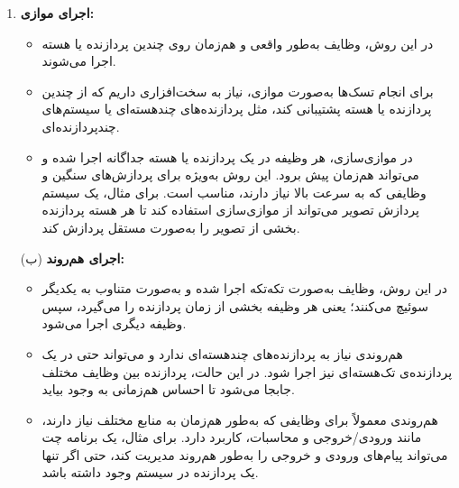 \begin{enumerate}
	\begin{qsolve}
		\begin{enumerate}
			\item 
			\textbf{اجرای موازی:}\\
			\begin{itemize}
				\item 
				در این روش، وظایف به‌طور واقعی و هم‌زمان روی چندین پردازنده یا هسته اجرا می‌شوند.
				
				\item 
				برای انجام تسک‌ها به‌صورت موازی، نیاز به سخت‌افزاری داریم که از چندین پردازنده یا هسته پشتیبانی کند، مثل پردازنده‌های چند‌هسته‌ای یا سیستم‌های چند‌پردازنده‌ای.
				
			\end{itemize}
			
		\end{enumerate}
	\end{qsolve}
	
	
	
	\begin{qsolve}
		\begin{enumerate}
			\item [ ]
			\begin{itemize}
				\item 
				در موازی‌سازی، هر وظیفه در یک پردازنده یا هسته جداگانه اجرا شده و می‌تواند هم‌زمان پیش برود. این روش به‌ویژه برای پردازش‌های سنگین و وظایفی که به سرعت بالا نیاز دارند، مناسب است. برای مثال، یک سیستم پردازش تصویر می‌تواند از موازی‌سازی استفاده کند تا هر هسته پردازنده بخشی از تصویر را به‌صورت مستقل پردازش کند.
			\end{itemize}
		\end{enumerate}
		
		\begin{enumerate}
			\item [(ب)]
			\textbf{اجرای هم‌روند:}\\
			\begin{itemize}
				\item 
				در این روش، وظایف به‌صورت تکه‌تکه اجرا شده و به‌صورت متناوب به یکدیگر سوئیچ می‌کنند؛ یعنی هر وظیفه بخشی از زمان پردازنده را می‌گیرد، سپس وظیفه دیگری اجرا می‌شود.
				
				\item 
				هم‌روندی نیاز به پردازنده‌های چند‌هسته‌ای ندارد و می‌تواند حتی در یک پردازنده‌ی تک‌هسته‌ای نیز اجرا شود. در این حالت، پردازنده بین وظایف مختلف جابجا می‌شود تا احساس هم‌زمانی به وجود بیاید.
				
				\item 
				هم‌روندی معمولاً برای وظایفی که به‌طور هم‌زمان به منابع مختلف نیاز دارند، مانند ورودی/خروجی و محاسبات، کاربرد دارد. برای مثال، یک برنامه چت می‌تواند پیام‌های ورودی و خروجی را به‌طور هم‌روند مدیریت کند، حتی اگر تنها یک پردازنده در سیستم وجود داشته باشد.
			\end{itemize}
		\end{enumerate}
	\end{qsolve}
	

\end{enumerate}

